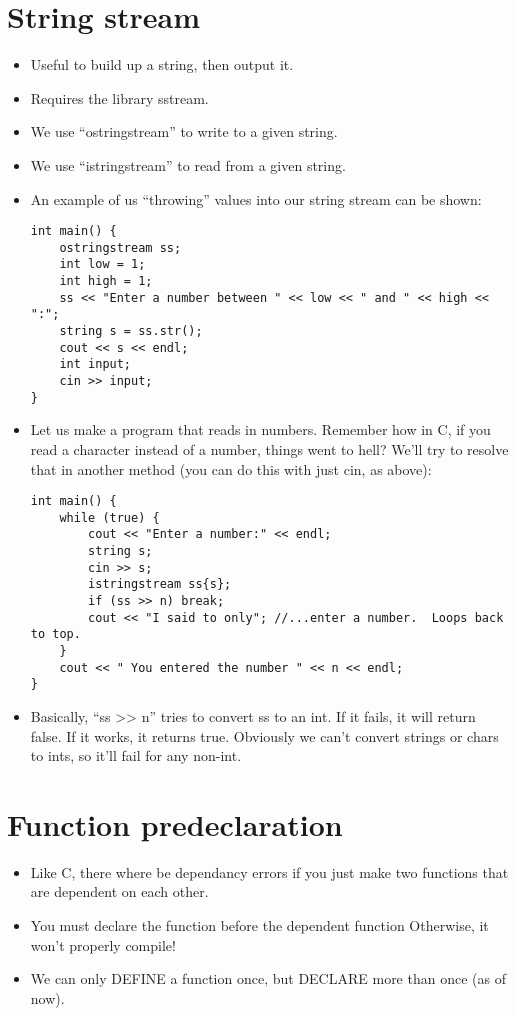 \documentclass{article}
\begin{document}
\section{String stream}
\begin{itemize}
\item Useful to build up a string, then output it.
\item Requires the library sstream.
\item We use ``ostringstream'' to write to a given string.
\item We use ``istringstream'' to read from a given string.
\item An example of us ``throwing'' values into our string stream can be shown:
\begin{lstlisting}
int main() {
    ostringstream ss;
    int low = 1;
    int high = 1;
    ss << "Enter a number between " << low << " and " << high << ":";
    string s = ss.str();
    cout << s << endl;
    int input;
    cin >> input;
}
\end{lstlisting}
\item Let us make a program that reads in numbers.  Remember how in C, if you read a character instead of a number, things went to hell?  We'll try to resolve that in another method (you can do this with just cin, as above):
\begin{lstlisting}
int main() {
    while (true) {
        cout << "Enter a number:" << endl;
        string s;
        cin >> s;
        istringstream ss{s};
        if (ss >> n) break;
        cout << "I said to only"; //...enter a number.  Loops back to top. 
    }
    cout << " You entered the number " << n << endl;
}
\end{lstlisting}
\item Basically, ``ss >> n'' tries to convert ss to an int.  If it fails, it will return false.  If it works, it returns true.  Obviously we can't convert strings or chars to ints, so it'll fail for any non-int.
\end{itemize}

\section{Function predeclaration}
\begin{itemize}
\item Like C, there where be dependancy errors if you just make two functions that are dependent on each other.  
\item You must declare the function before the dependent function  Otherwise, it won't properly compile!
\item We can only DEFINE a function once, but DECLARE more than once (as of now).

\end{itemize}
\end{document}
